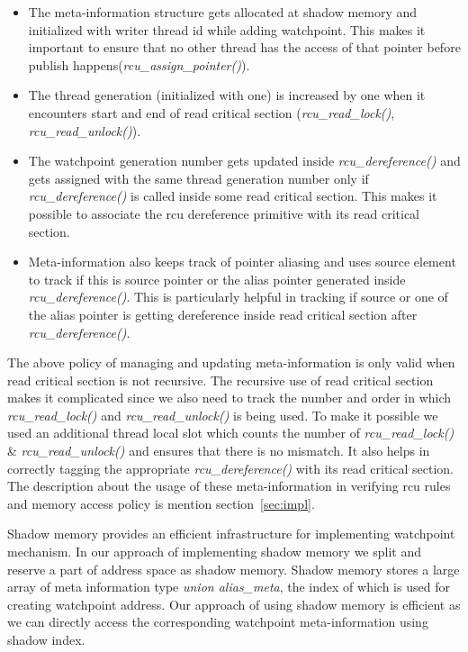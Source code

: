 \begin{itemize}
    	\item	The meta-information structure gets allocated at shadow memory and initialized with writer thread id while adding watchpoint. This makes it important to ensure that no other thread has the access of that pointer before publish happens(\emph{rcu\_assign\_pointer()}). 
    	\item 	The thread generation (initialized with one) is increased by one when it encounters start and end of read critical section (\emph{rcu\_read\_lock()}, \emph{rcu\_read\_unlock()}).  
	\item 	The watchpoint generation number gets updated inside \emph{rcu\_dereference()} and gets assigned with the same thread generation number only if \emph{rcu\_dereference()} is called inside some read critical section. This makes it possible to associate the rcu dereference primitive with its read critical section.
	\item 	Meta-information also keeps track of pointer aliasing and uses source element to track if this is source pointer or the alias pointer generated inside \emph{rcu\_dereference()}. This is particularly helpful in tracking if source or one of the alias pointer is getting dereference inside read critical section after \emph{rcu\_dereference()}.
\end{itemize}

The above policy of managing and updating meta-information is only valid when read critical section is not recursive. The recursive use of read critical section makes it complicated since we also need to track the number and order in which \emph{rcu\_read\_lock()} and \emph{rcu\_read\_unlock()} is being used. To make it possible we used an additional thread local slot which counts the number of \emph{rcu\_read\_lock()} \& \emph{rcu\_read\_unlock()} and ensures that there is no mismatch. It also helps in correctly tagging the appropriate \emph{rcu\_dereference()} with its read critical section. The description about the usage of these meta-information in verifying rcu rules and memory access policy is mention section~\ref{sec:impl}. 

Shadow memory provides an efficient infrastructure for implementing watchpoint mechanism. In our approach of implementing shadow memory we split and reserve a part of address space as shadow memory. Shadow memory stores a large array of meta information type \emph{union alias\_meta}, the index of which is used for creating watchpoint address. Our approach of using shadow memory is efficient as we can directly access the corresponding watchpoint meta-information using shadow index. 

